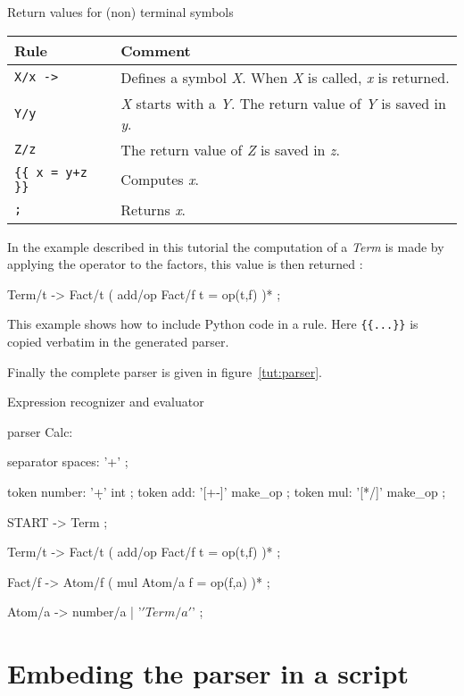 \begin{tableau}
\caption{Return values for (non) terminal symbols}			\label{tut:ret_val}
\begin{tabular}{| l | p{9cm} |}
\hline
	Rule & Comment \\
\hline
	\verb!X/x ->!			& Defines a symbol \emph{X}. When \emph{X} is called, \emph{x} is returned. \\
	\verb!Y/y!				& \emph{X} starts with a \emph{Y}. The return value of \emph{Y} is saved in \emph{y}. \\
	\verb!Z/z!				& The return value of \emph{Z} is saved in \emph{z}. \\
	\verb!{{ x = y+z }}!	& Computes \emph{x}. \\
	\verb!;!				& Returns \emph{x}. \\
\hline
\end{tabular}
\end{tableau}

In the example described in this tutorial the computation of a \emph{Term} is made by applying the operator to the factors, this value is then returned :

\begin{verbatimtab}[4]
	Term/t -> Fact/t ( add/op Fact/f {{ t = op(t,f) }} )* ;
\end{verbatimtab}

This example shows how to include Python code in a rule. Here \verb!{{...}}! is copied verbatim in the generated parser.

Finally the complete parser is given in figure~\ref{tut:parser}.

\begin{code}
\caption{Expression recognizer and evaluator}				\label{tut:parser}
\begin{verbatimtab}[4]
parser Calc:

	separator spaces: '\s+' ;

	token number: '\d+' int ;
	token add: '[+-]' make_op ;
	token mul: '[*/]' make_op ;

	START -> Term ;

	Term/t -> Fact/t ( add/op Fact/f {{ t = op(t,f) }} )* ;

	Fact/f -> Atom/f ( mul Atom/a {{ f = op(f,a) }} )* ;

	Atom/a -> number/a | '\(' Term/a '\)' ;
\end{verbatimtab}
\end{code}

\section{Embeding the parser in a script}

